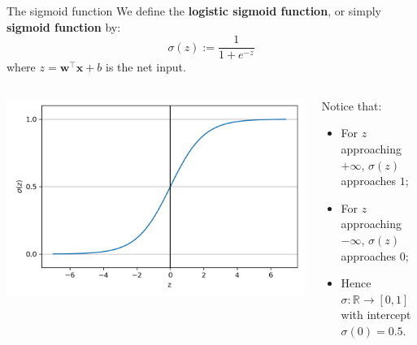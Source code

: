 \documentclass[aspectratio=169]{beamer}
\begin{document}
\begin{frame}{The sigmoid function}
We define the \textbf{logistic sigmoid function}, or simply \textbf{sigmoid function} by:
	\begin{equation*}
		\sigma(z) := \frac{1}{1+e^{-z}}
	\end{equation*}
where $z =  \mathbf{w}^\top \mathbf{x} + b$ is the net input.

\vfill 


\begin{columns}
	\begin{column}{0.5\textwidth}
			\begin{center}    
			\includegraphics[width=\textwidth]{figures/03_02.png}
		\end{center}
	\end{column}
	\begin{column}{0.5\textwidth}
	Notice that:
	\begin{itemize}
		\item For $z$ approaching $+\infty$, $\sigma(z)$ approaches $1$;
		\item For $z$ approaching $-\infty$, $\sigma(z)$ approaches $0$;
		\item Hence $\sigma: \mathbb{R} \to [0, 1]$ with intercept $\sigma(0) = 0.5$.
	\end{itemize}
\end{column}
\end{columns}
\end{frame}
\end{document}
